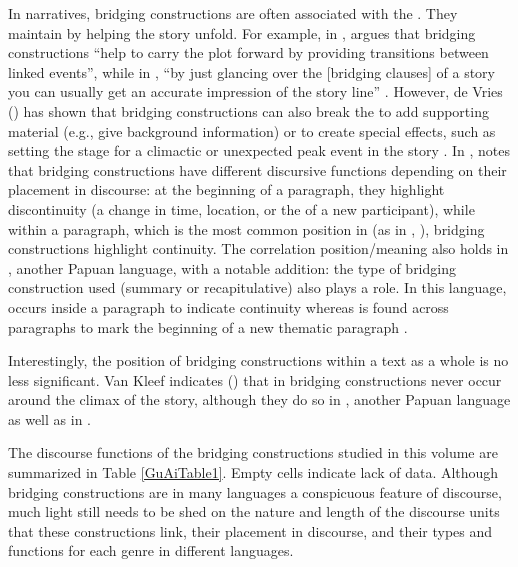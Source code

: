 \documentclass[output=paper]{LSP/langsci}
\begin{document}
In narratives, bridging constructions are often associated with the . They maintain  by helping the story unfold. For example, in , \citet[][1324]{Jendraschek09} argues that bridging constructions ``help to carry the plot forward by providing transitions between linked events'', while in , ``by just glancing over the [bridging clauses] of a story you can usually get an accurate impression of the story line''  \citep[][153]{kleef88}.  However, de Vries (\citeyear{devries.2005, devries.2006}) has shown that bridging constructions can also break the  to add supporting material (e.g., give background information) or to create special effects, such as setting the stage for a climactic or unexpected peak event in the story  \citep[][373]{devries.2005}. In ,  \citet[][151--152]{kleef88} notes that bridging constructions have different discursive functions depending on their placement in discourse: at the beginning of a paragraph, they highlight discontinuity (a change in time, location, or the  of a new participant), while within a paragraph, which is the most common position in  (as in , \citealt[][123]{Guillaume2011}), bridging constructions highlight continuity. The correlation position\slash meaning also holds in , another Papuan language, with a notable addition: the type of bridging construction used (summary or recapitulative) also plays a role. In this language,  occurs inside a paragraph to indicate continuity whereas  is found across paragraphs to mark the beginning of a new thematic paragraph \citep[][23--30]{logan08}.

Interestingly, the position of bridging constructions within a text as a whole is no less significant. Van Kleef indicates (\citeyear[152]{kleef88}) that in  bridging constructions never occur around the climax of the story, although they do so in , another Papuan language as well as in  . 

The discourse functions of the bridging constructions studied in this volume are summarized in Table \ref{GuAiTable1}. Empty cells indicate lack of data. Although bridging constructions are in many languages a conspicuous feature of discourse, much light still needs to be shed on the nature and length of the discourse units that these constructions link, their placement in discourse, and their types and functions for each genre in different languages.
\end{document}
